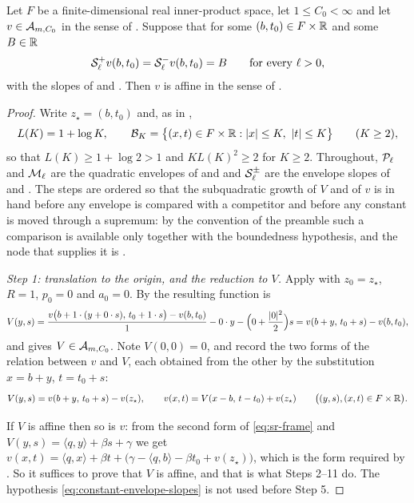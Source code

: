 \begin{lemma}
Let $F$ be a finite-dimensional real inner-product space, let $1\le C_0<\infty$
and let $v\in\mathcal{A}_{m,C_0}$ in the sense of . Suppose that
for some $(b,t_0)\in F\times\mathbb{R}$ and some $B\in\mathbb{R}$
\begin{equation}\label{eq:constant-envelope-slopes}
  \mathcal{S}_\ell^+v(b,t_0)=\mathcal{S}_\ell^-v(b,t_0)=B
       \qquad\text{for every }\ell>0,
\end{equation}
with the slopes of  and . Then $v$ is
affine in the sense of .
\end{lemma}
\begin{proof}
Write $z_\star=(b,t_0)$ and, as in ,
\[
  L(K)=1+\log K,\qquad
  \mathcal B_K=\bigl\{(x,t)\in F\times\mathbb{R}:|x|\le K,\ |t|\le K\bigr\}
  \qquad(K\ge2),
\]
so that $L(K)\ge1+\log2>1$ and $KL(K)^2\ge2$ for $K\ge2$. Throughout,
$\mathcal{P}_\ell$ and $\mathcal{M}_\ell$ are the quadratic envelopes of 
and  and $\mathcal{S}^\pm_\ell$ are the envelope slopes of
 and . The steps are ordered so that the
subquadratic growth of $V$ and of $v$ is in hand before any envelope is
compared with a competitor and before any constant is moved through a
supremum: by the convention of the preamble such a comparison is available only
together with the boundedness hypothesis, and the node that supplies it is
.

\emph{Step 1: translation to the origin, and the reduction to $V$.}
Apply  with $z_0=z_\star$, $R=1$, $p_0=0$ and $a_0=0$.
By  the resulting function is
\[
  V(y,s)=\frac{v\bigl(b+1\cdot(y+0\cdot s),\,t_0+1\cdot s\bigr)-v(b,t_0)}{1}
   -0\cdot y-\Bigl(0+\frac{|0|^2}{2}\Bigr)s=v(b+y,\,t_0+s)-v(b,t_0),
\]
and  gives $V\in\mathcal{A}_{m,C_0}$. Note $V(0,0)=0$, and
record the two forms of the relation between $v$ and $V$, each obtained from
the other by the substitution $x=b+y$, $t=t_0+s$:
\begin{equation}\label{eq:sr-frame}
  V(y,s)=v(b+y,\,t_0+s)-v(z_\star),\qquad
  v(x,t)=V(x-b,\,t-t_0)+v(z_\star)
  \qquad\bigl((y,s),(x,t)\in F\times\mathbb{R}\bigr).
\end{equation}

If $V$ is affine then so is $v$: from the second form of \eqref{eq:sr-frame}
and $V(y,s)=\langle q,y\rangle+\beta s+\gamma$ we get
$v(x,t)=\langle q,x\rangle+\beta t+\bigl(\gamma-\langle q,b\rangle-\beta
t_0+v(z_\star)\bigr)$, which is the form required by
. So it suffices to prove that $V$ is affine, and
that is what Steps 2--11 do. The hypothesis \eqref{eq:constant-envelope-slopes}
is not used before Step 5.


\end{proof}
